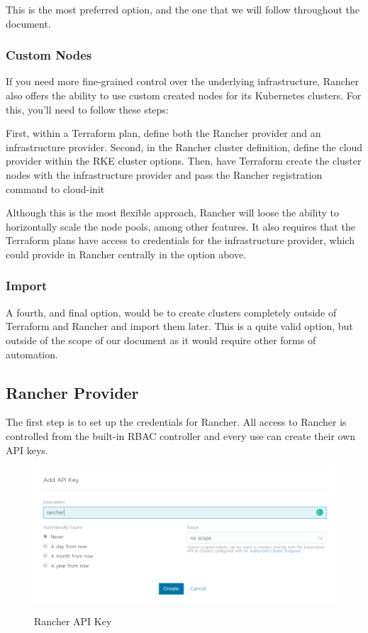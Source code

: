 This is the most preferred option, and the one that we will follow throughout the document.

\subsubsection{Custom Nodes}

If you need more fine-grained control over the underlying infrastructure, Rancher also offers the ability to use custom created nodes for its Kubernetes clusters. For this, you'll need to follow these steps:

First, within a  Terraform plan, define both the Rancher provider and an infrastructure provider. Second, in the Rancher cluster definition, define the cloud provider within the RKE cluster options. Then, have Terraform create the cluster nodes with the infrastructure provider and pass the Rancher registration command to cloud-init

Although this is the most flexible approach, Rancher will loose the ability to horizontally scale the node pools, among other features. It also requires that the Terraform plans have access to credentials for the infrastructure provider, which could provide in Rancher centrally in the option above.

\subsubsection{Import}

A fourth, and final option, would be to create clusters completely outside of Terraform and Rancher and import them later. This is a quite valid option, but outside of the scope of our document as it would require other forms of automation.

\subsection{Rancher Provider}

The first step is to set up the credentials for Rancher. All access to Rancher is controlled from the built-in RBAC controller and every use can create their own API keys.

\begin{figure}[H]
\centering
\caption {Rancher API Key}
\includegraphics[width=\linewidth]{images/rancher-api-key.png}
\label{fig:rancherAPI}
\end{figure}

